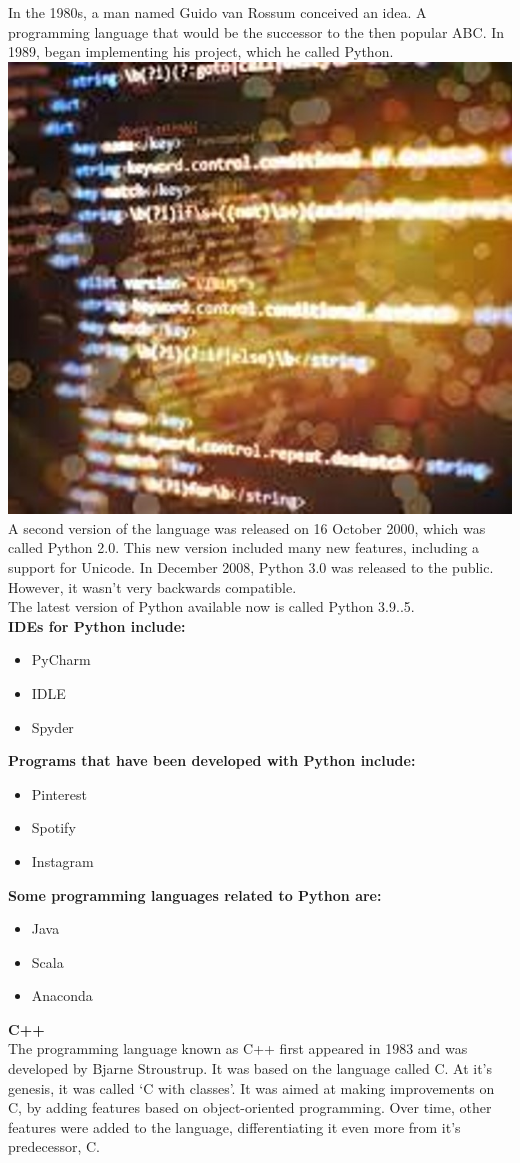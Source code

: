 \documentclass{article}
\begin{document}
In the 1980s, a man named Guido van Rossum conceived an idea. A programming language that would be the successor to the then popular ABC. In 1989, began implementing his project, which he called Python.\\
\includegraphics[width=0.5\linewidth]{picture300}\\
A second version of the language was released on 16 October 2000, which was called Python 2.0. This new version included many new features, including a support for Unicode.
In December 2008, Python 3.0 was released to the public. However, it wasn’t very backwards compatible.\\
The latest version of Python available now is called Python 3.9..5.\\
\textbf{IDEs for Python include:}\\
\begin{itemize}
	\item PyCharm
	\item IDLE
	\item Spyder
\end{itemize}
\textbf{Programs that have been developed with Python include:}\\
\begin{itemize}
	\item Pinterest
	\item Spotify
	\item Instagram
\end{itemize}
\textbf{Some programming languages related to Python are:}\\
\begin{itemize}
	\item Java
	\item Scala
	\item Anaconda
\end{itemize}
	\textbf{C++}\\
	The programming language known as C++ first appeared in 1983 and was developed by Bjarne Stroustrup. It was based on the language called C. At it’s genesis, it was called ‘C with classes’. It was aimed at making improvements on C, by adding features based on object-oriented programming. Over time, other features were added to the language, differentiating it even more from it’s predecessor, C.\\
\end{document}
